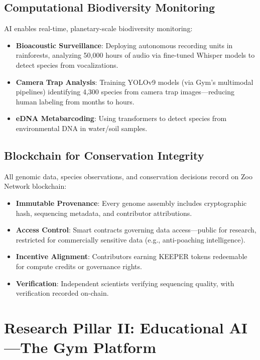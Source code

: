 \documentclass[twocolumn,11pt]{article}
\begin{document}
\subsection{Computational Biodiversity Monitoring}

AI enables real-time, planetary-scale biodiversity monitoring:

\begin{itemize}
    \item \textbf{Bioacoustic Surveillance}: Deploying autonomous recording units in rainforests, analyzing 50,000 hours of audio via fine-tuned Whisper models to detect species from vocalizations.
    \item \textbf{Camera Trap Analysis}: Training YOLOv9 models (via Gym's multimodal pipelines) identifying 4,300 species from camera trap images—reducing human labeling from months to hours.
    \item \textbf{eDNA Metabarcoding}: Using transformers to detect species from environmental DNA in water/soil samples.
\end{itemize}

\subsection{Blockchain for Conservation Integrity}

All genomic data, species observations, and conservation decisions record on Zoo Network blockchain:

\begin{itemize}
    \item \textbf{Immutable Provenance}: Every genome assembly includes cryptographic hash, sequencing metadata, and contributor attributions.
    \item \textbf{Access Control}: Smart contracts governing data access—public for research, restricted for commercially sensitive data (e.g., anti-poaching intelligence).
    \item \textbf{Incentive Alignment}: Contributors earning KEEPER tokens redeemable for compute credits or governance rights.
    \item \textbf{Verification}: Independent scientists verifying sequencing quality, with verification recorded on-chain.
\end{itemize}

\section{Research Pillar II: Educational AI—The Gym Platform}
\end{document}
